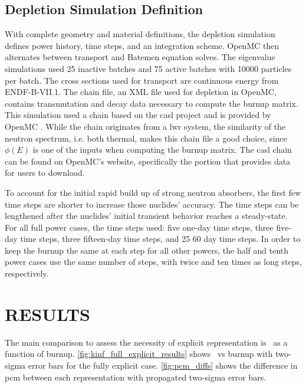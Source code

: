 \documentclass[letterpaper]{physor2024}
\begin{document}
\subsection{Depletion Simulation Definition}\label{sec:depl_sim}
With complete geometry and material definitions, the depletion simulation defines power history, time steps, and an integration scheme. OpenMC then alternates between transport and Batemen equation solves. The eigenvalue simulations used 25 inactive batches and 75 active batches with 10000 particles per batch. The cross sections used for transport are continuous energy from ENDF-B-VII.1. The chain file, an XML file used for depletion in OpenMC, contains transmutation and decay data necessary to compute the burnup matrix. This simulation used a chain based on the \gls{casl} project \cite{CASL-report} and is provided by OpenMC \cite{openmc-chains}. While the chain originates from a \gls{lwr} system, the similarity of the neutron spectrum, i.e. both thermal, makes this chain file a good choice, since $\phi(E)$ is one of the inputs when computing the burnup matrix. The \gls{casl} chain can be found on OpenMC's website, specifically the portion that provides data for users to download.

To account for the initial rapid build up of strong neutron absorbers, the first few time steps are shorter to increase those nuclides' accuracy. The time steps can be lengthened after the nuclides' initial transient behavior reaches a steady-state. For all full power cases, the time steps used: five one-day time steps, three five-day time steps, three fifteen-day time steps, and 25 60 day time steps. In order to keep the burnup the same at each step for all other powers, the half and tenth power cases use the same number of steps, with twice and ten times as long steps, respectively.

\section{RESULTS}\label{sec:results}
The main comparison to assess the necessity of explicit representation is \kinf~as a function of burnup. \cref{fig:kinf_full_explicit_results} shows \kinf~vs burnup with two-sigma error bars for the fully explicit case. \cref{fig:pcm_diffs} shows the difference in \gls{pcm} between each representation with propagated two-sigma error bars.
\end{document}
